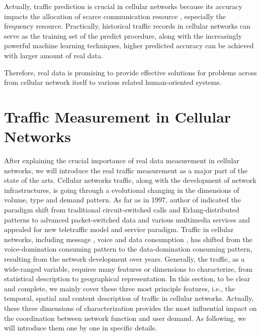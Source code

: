 {Actually, traffic prediction is crucial in cellular networks because its accuracy impacts the allocation of scarce communication resource \cite{tan2008empirical}, especially the frequency resource. Practically, historical traffic records in cellular networks can serve as the training set of the predict procedure, along with the increasingly powerful machine learning techniques, higher predicted accuracy can be achieved with larger amount of real data.

Therefore, real data is promising to provide effective solutions for problems across from cellular network itself to various related human-oriented systems.

\section{Traffic Measurement in Cellular Networks}
After explaining the crucial importance of real data measurement in cellular networks, we will introduce the real traffic measurement as a major part of the state of the arts. Cellular networks traffic, along with the development of network infrastructures, is going through a evolutional changing in the dimensions of volume, type and demand pattern. As far as in 1997, author of \cite{wirth1997role} indicated the paradigm shift from traditional circuit-switched calls and Erlang-distributed patterns to advanced packet-switched data and various multimedia services and appealed for new teletraffic model and service paradigm. Traffic in cellular networks, including message \cite{zerfos2006study}, voice \cite{willkomm2008primary} and data consumption \cite{shafiq2011characterizing}, has shifted from the voice-domination consuming pattern to the data-domination consuming pattern, resulting from the network development over years. Generally, the traffic, as a wide-ranged variable, requires many features or dimensions to characterize, from statistical description to geographical representation. In this section, to be clear and complete, we mainly cover these three most principle features, i.e., the temporal, spatial and content description of traffic in cellular networks. Actually, these three dimensions of characterization provides the most influential impact on the coordination between network function and user demand. As following, we will introduce them one by one in specific details.

}
